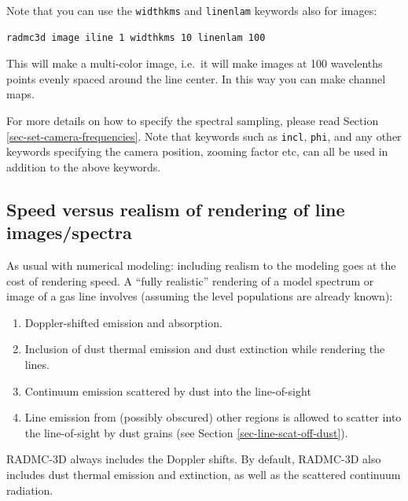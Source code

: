 \documentclass{report}
\begin{document}
Note that you can use the {\small\tt widthkms} and {\small\tt linenlam}
keywords also for images:
{\small\begin{verbatim}
radmc3d image iline 1 widthkms 10 linenlam 100
\end{verbatim}}
This will make a multi-color image, i.e.~it will make images at
100 wavelenths points evenly spaced around the line center. In this way
you can make channel maps.

For more details on how to specify the spectral sampling, please read
Section \ref{sec-set-camera-frequencies}. Note that keywords such as
{\small\tt incl}, {\small\tt phi}, and any other keywords specifying the
camera position, zooming factor etc, can all be used in addition to the
above keywords.


\subsection{Speed versus realism of rendering of line images/spectra}
\label{sec-line-render-speed-realism}
As usual with numerical modeling: including realism to the modeling goes at
the cost of rendering speed. A ``fully realistic'' rendering of a model
spectrum or image of a gas line involves (assuming the level populations
are already known):
\begin{enumerate}
\item Doppler-shifted emission and absorption.
\item Inclusion of dust thermal emission and dust extinction while rendering
  the lines.
\item Continuum emission scattered by dust into the line-of-sight
\item Line emission from (possibly obscured) other regions is allowed to
  scatter into the line-of-sight by dust grains (see Section
  \ref{sec-line-scat-off-dust}).
\end{enumerate}
RADMC-3D always includes the Doppler shifts. By default, RADMC-3D also
includes dust thermal emission and extinction, as well as the scattered
continuum radiation. 


\end{document}
